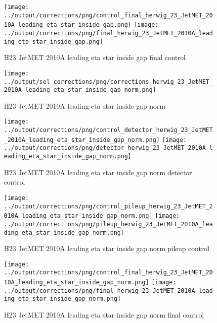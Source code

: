 \documentclass[11pt]{book}
\begin{document}
\begin{figure}[ht]
\centering
\texttt{[image: ../output/corrections/png/control\_final\_herwig\_23\_JetMET\_2010A\_leading\_eta\_star\_inside\_gap.png]}
\texttt{[image: ../output/corrections/png/final\_herwig\_23\_JetMET\_2010A\_leading\_eta\_star\_inside\_gap.png]}
\caption{H23 JetMET 2010A leading eta star inside gap final control}
\label{fig:H23_JetMET_2010A_leading_eta_star_inside_gap_final_control}
\end{figure}



\begin{figure}[ht]
\centering
\texttt{[image: ../output/sel\_corrections/png/corrections\_herwig\_23\_JetMET\_2010A\_leading\_eta\_star\_inside\_gap\_norm.png]}
\caption{H23 JetMET 2010A leading eta star inside gap norm}
\label{fig:H23_JetMET_2010A_leading_eta_star_inside_gap_norm}
\end{figure}

\begin{figure}[ht]
\centering
\texttt{[image: ../output/corrections/png/control\_detector\_herwig\_23\_JetMET\_2010A\_leading\_eta\_star\_inside\_gap\_norm.png]}
\texttt{[image: ../output/corrections/png/detector\_herwig\_23\_JetMET\_2010A\_leading\_eta\_star\_inside\_gap\_norm.png]}
\caption{H23 JetMET 2010A leading eta star inside gap norm detector control}
\label{fig:H23_JetMET_2010A_leading_eta_star_inside_gap_norm_detector_control}
\end{figure}

\begin{figure}[ht]
\centering
\texttt{[image: ../output/corrections/png/control\_pileup\_herwig\_23\_JetMET\_2010A\_leading\_eta\_star\_inside\_gap\_norm.png]}
\texttt{[image: ../output/corrections/png/pileup\_herwig\_23\_JetMET\_2010A\_leading\_eta\_star\_inside\_gap\_norm.png]}
\caption{H23 JetMET 2010A leading eta star inside gap norm pileup control}
\label{fig:H23_JetMET_2010A_leading_eta_star_inside_gap_norm_pileup_control}
\end{figure}


\begin{figure}[ht]
\centering
\texttt{[image: ../output/corrections/png/control\_final\_herwig\_23\_JetMET\_2010A\_leading\_eta\_star\_inside\_gap\_norm.png]}
\texttt{[image: ../output/corrections/png/final\_herwig\_23\_JetMET\_2010A\_leading\_eta\_star\_inside\_gap\_norm.png]}
\caption{H23 JetMET 2010A leading eta star inside gap norm final control}
\label{fig:H23_JetMET_2010A_leading_eta_star_inside_gap_norm_final_control}
\end{figure}
\end{document}
